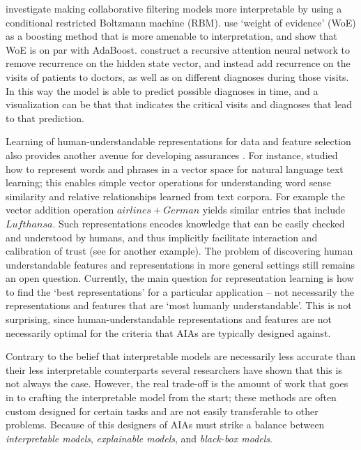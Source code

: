 \citet{Abdollahi2016-vn} investigate making collaborative filtering models more interpretable by using a conditional restricted Boltzmann machine (RBM). \citet{Ridgeway1998-lv} use `weight of evidence' (WoE) as a boosting method that is more amenable to interpretation, and show that WoE is on par with AdaBoost. \citet{Choi2016-by} construct a recursive attention neural network to remove recurrence on the hidden state vector, and instead add recurrence on the visits of patients to doctors, as well as on different diagnoses during those visits. In this way the model is able to predict possible diagnoses in time, and a visualization can be that that indicates the critical visits and diagnoses that lead to that prediction.

Learning of human-understandable representations for data and feature selection also provides another avenue for developing assurances  \cite{Bengio2013-uv, Guyon2003-fj}. For instance, \citet{Mikolov2013-lt} studied how to represent words and phrases in a vector space for natural language text learning; this enables simple vector operations for understanding word sense similarity and relative relationships learned from text corpora. For example the vector addition operation $airlines+German$ yields similar entries that include $Lufthansa$. Such representations encodes knowledge that can be easily checked and understood by humans, and thus implicitly facilitate interaction and calibration of trust (see \cite{Haury2011-zi} for another example). The problem of discovering human understandable features and representations in more general settings still remains an open question. Currently, the main question for representation learning is how to find the `best representations' for a particular application -- not necessarily the representations and features that are `most humanly understandable'. This is not surprising, since human-understandable representations and features are not necessarily optimal for the criteria that AIAs are typically designed against. 

Contrary to the belief that interpretable models are necessarily less accurate than their less interpretable counterparts several researchers have shown that this is not always the case. However, the real trade-off is the amount of work that goes in to crafting the interpretable model from the start; these methods are often custom designed for certain tasks and are not easily transferable to other problems. Because of this designers of AIAs must strike a balance between \emph{interpretable models}, \emph{explainable models}, and \emph{black-box models}.

